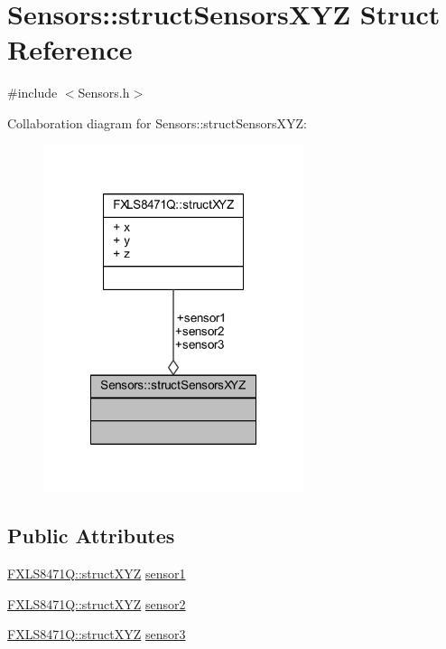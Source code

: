 \hypertarget{struct_sensors_1_1struct_sensors_x_y_z}{}\section{Sensors\+:\+:struct\+Sensors\+X\+YZ Struct Reference}
\label{struct_sensors_1_1struct_sensors_x_y_z}


{\ttfamily \#include $<$Sensors.\+h$>$}



Collaboration diagram for Sensors\+:\+:struct\+Sensors\+X\+YZ\+:\nopagebreak
\begin{figure}[H]
\begin{center}
\leavevmode
\includegraphics[width=216pt]{struct_sensors_1_1struct_sensors_x_y_z__coll__graph}
\end{center}
\end{figure}
\subsection*{Public Attributes}
\begin{DoxyCompactItemize}
\item 
\hyperlink{struct_f_x_l_s8471_q_1_1struct_x_y_z}{F\+X\+L\+S8471\+Q\+::struct\+X\+YZ} \hyperlink{struct_sensors_1_1struct_sensors_x_y_z_a88c3affd022da7975c8011a3640ac655}{sensor1}
\item 
\hyperlink{struct_f_x_l_s8471_q_1_1struct_x_y_z}{F\+X\+L\+S8471\+Q\+::struct\+X\+YZ} \hyperlink{struct_sensors_1_1struct_sensors_x_y_z_a79527c333b737562740be33cb0c03f30}{sensor2}
\item 
\hyperlink{struct_f_x_l_s8471_q_1_1struct_x_y_z}{F\+X\+L\+S8471\+Q\+::struct\+X\+YZ} \hyperlink{struct_sensors_1_1struct_sensors_x_y_z_a6b58731f4717dedef149f292c7098b8e}{sensor3}
\end{DoxyCompactItemize}


